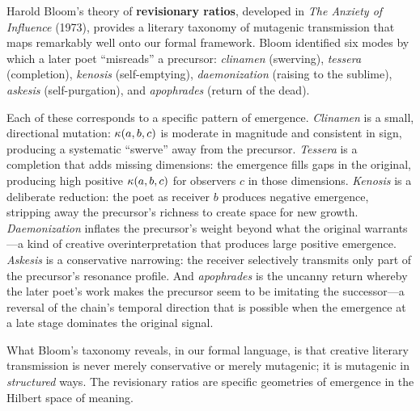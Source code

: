 \begin{interpretation}
\label{interp:ch9:bloom_revisionary_ratios}
Harold Bloom's theory of \textbf{revisionary ratios}, developed in \emph{The
Anxiety of Influence} (1973), provides a literary taxonomy of mutagenic
transmission that maps remarkably well onto our formal framework.  Bloom
identified six modes by which a later poet ``misreads'' a precursor:
\emph{clinamen} (swerving), \emph{tessera} (completion), \emph{kenosis}
(self-emptying), \emph{daemonization} (raising to the sublime),
\emph{askesis} (self-purgation), and \emph{apophrades} (return of the dead).

Each of these corresponds to a specific pattern of emergence.  \emph{Clinamen}
is a small, directional mutation: $\kappa(a, b, c)$ is moderate in magnitude
and consistent in sign, producing a systematic ``swerve'' away from the
precursor.  \emph{Tessera} is a completion that adds missing dimensions:
the emergence fills gaps in the original, producing high positive
$\kappa(a, b, c)$ for observers $c$ in those dimensions.  \emph{Kenosis}
is a deliberate reduction: the poet as receiver $b$ produces negative
emergence, stripping away the precursor's richness to create space for new
growth.  \emph{Daemonization} inflates the precursor's weight beyond what
the original warrants---a kind of creative overinterpretation that produces
large positive emergence.  \emph{Askesis} is a conservative narrowing: the
receiver selectively transmits only part of the precursor's resonance
profile.  And \emph{apophrades} is the uncanny return whereby the later
poet's work makes the precursor seem to be imitating the successor---a
reversal of the chain's temporal direction that is possible when the
emergence at a late stage dominates the original signal.

What Bloom's taxonomy reveals, in our formal language, is that creative
literary transmission is never merely conservative or merely mutagenic; it is
mutagenic in \emph{structured} ways.  The revisionary ratios are specific
geometries of emergence in the Hilbert space of meaning.
\end{interpretation}


